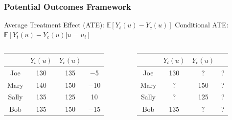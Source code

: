 \documentclass{beamer}
\begin{document}
\begin{frame}
	\frametitle{Potential Outcomes Framework}
	Average Treatment Effect (ATE): $ \mathbb{E}[Y_t(u) - Y_c(u)] $ \newline
	Conditional ATE: $ \mathbb{E}[Y_t(u) - Y_c(u) | u=u_i ] $

	\begin{columns}
		\begin{column}{0.5 \textwidth}
		\begin{table}
			\centering
			\begin{tabularx}{\linewidth}{| c | c | c | c |} 
			\hline 
			& $ Y_{t}(u) $  & $ Y_{c}(u) $ & \\
			\hline
				Joe    & 130     & 135    & −5 \\
				Mary   & 140     & 150    & −10 \\
				Sally  & 135     & 125    & 10 \\
				Bob    & 135     & 150    & −15 \\
			\hline
			\hline
			\end{tabularx}
		\end{table}
		\end{column}
		\begin{column}{0.5 \textwidth}
		\begin{table}
			\centering
			\begin{tabularx}{\textwidth}{| c | c | c | c |} 
			\hline 
			& $ Y_{t}(u) $  & $ Y_{c}(u) $ & \\
			\hline
				Joe    & 130     & ? & ? \\
				Mary   & ? & 150    &  ? \\
				Sally  & ? & 125    &  ? \\
				Bob    & 135     & ? & ? \\
			\hline
			\hline
			\end{tabularx}
		\end{table}
		\end{column}
	\end{columns}	
\end{frame}
\end{document}

